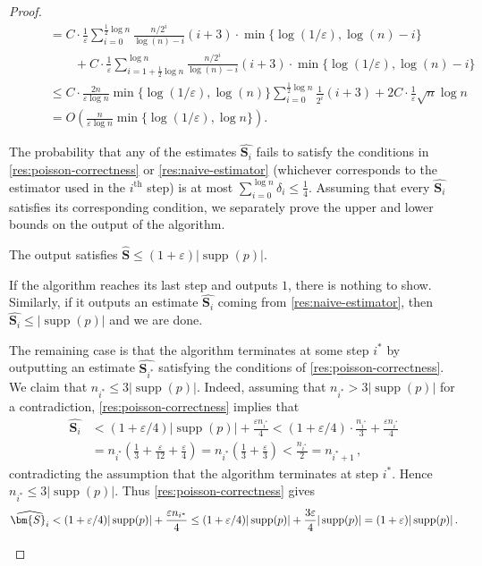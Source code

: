 \documentclass{theoretics}
\DeclareMathOperator{\supp}{supp}   %
\renewcommand{\epsilon}{\varepsilon}
\begin{document}
\begin{proof}
\begin{align*}
&\qquad= C \cdot \frac{1}{\epsilon}\sum_{i=0}^{\tfrac{1}{2} \log n} \frac{n/2^i}{\log(n)-i}
    (i + 3) \cdot \min\{ \log(1/\epsilon),
\log(n) - i \} \\
&\qquad\qquad+ C \cdot \frac{1}{\epsilon}\sum_{i=1+\tfrac{1}{2}\log n}^{\log n}
    \frac{n/2^i}{\log(n)-i} (i + 3) \cdot \min\{ \log(1/\epsilon),
\log(n) - i \} \\
&\qquad\leq C \cdot \frac{2n}{\epsilon \log n} \min\{\log(1/\epsilon), \log(n)\} \sum_{i=0}^{\tfrac{1}{2}
\log n} \frac{1}{2^i} (i + 3) + 2C \cdot \frac{1}{\epsilon}\sqrt n \log n \\
&\qquad= O\left( \frac{n}{\epsilon \log n} \min\{ \log(1/\epsilon), \log n \} \right).
\end{align*}

The probability that any of the estimates $\widehat{\bm{S}_i}$ fails to satisfy the conditions in
\cref{res:poisson-correctness} or \cref{res:naive-estimator} (whichever corresponds to the estimator
used in the $i^{\text{th}}$ step) is at most $\sum_{i=0}^{\log n} \delta_i \leq \frac{1}{4}$.
Assuming that every $\widehat{\bm{S}_i}$ satisfies its corresponding condition, we separately prove
the upper and lower bounds on the output of the algorithm.

\begin{claim}
    The output satisfies $\widehat{\bm{S}} \le (1+\epsilon)|\supp(p)|$.
\end{claim}
\begin{subproof}
    If the algorithm reaches its last step and outputs $1$, there is nothing to show. Similarly, if
    it outputs an estimate $\widehat{\bm{S}_i}$ coming from \cref{res:naive-estimator}, then
    $\widehat{\bm{S}_i} \le |\supp(p)|$ and we are done.

    The remaining case is that the algorithm terminates at some step $i^*$ by outputting an estimate
    $\widehat{\bm{S}_{i^*}}$ satisfying the conditions of \cref{res:poisson-correctness}. We claim
    that $n_{i^*} \le 3|\supp(p)|$. Indeed, assuming that $n_{i^*} > 3|\supp(p)|$ for a
    contradiction, \cref{res:poisson-correctness} implies that
    \begin{align*}
        \widehat{\bm{S}_i}
        &< (1 + \epsilon/4)|\supp(p)| + \frac{\epsilon n_{i^*}}{4}
        < (1 + \epsilon/4) \cdot \frac{n_{i^*}}{3} + \frac{\epsilon n_{i^*}}{4} \\
        &= n_{i^*} \left(\frac{1}{3} + \frac{\epsilon}{12} + \frac{\epsilon}{4}\right)
        = n_{i^*} \left(\frac{1}{3} + \frac{\epsilon}{3}\right)
        < \frac{n_{i^*}}{2}
        = n_{i^*+1} \,,
    \end{align*}
    contradicting the assumption that the algorithm terminates at step $i^*$. Hence $n_{i^*} \le
    3|\supp(p)|$. Thus \cref{res:poisson-correctness} gives
    \[
        \widehat{\bm{S}_i} < (1 + \epsilon/4)|\supp(p)| + \frac{\epsilon n_{i^*}}{4}
        \le (1 + \epsilon/4)|\supp(p)| + \frac{3\epsilon}{4} |\supp(p)|
        = (1 + \epsilon) |\supp(p)| \,.
        \qedhere
    \]
\end{subproof}


\end{proof}
\end{document}
